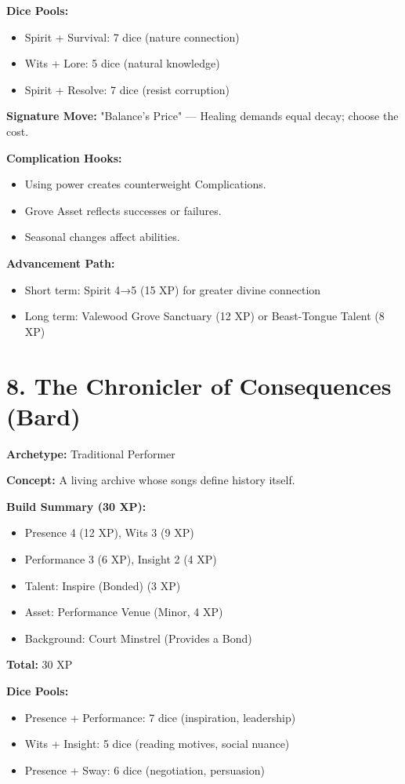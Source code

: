 \textbf{Dice Pools:}
\begin{itemize}
  \item Spirit + Survival: 7 dice (nature connection)
  \item Wits + Lore: 5 dice (natural knowledge)
  \item Spirit + Resolve: 7 dice (resist corruption)
\end{itemize}

\textbf{Signature Move:} "Balance's Price" — Healing demands equal decay; choose the cost.

\textbf{Complication Hooks:}
\begin{itemize}
  \item Using power creates counterweight Complications.
  \item Grove Asset reflects successes or failures.
  \item Seasonal changes affect abilities.
\end{itemize}

\textbf{Advancement Path:}
\begin{itemize}
  \item Short term: Spirit 4→5 (15 XP) for greater divine connection
  \item Long term: Valewood Grove Sanctuary (12 XP) or Beast-Tongue Talent (8 XP)
\end{itemize}

\section{8. The Chronicler of Consequences (Bard)}
\textbf{Archetype:} Traditional Performer

\textbf{Concept:} A living archive whose songs define history itself.

\textbf{Build Summary (30 XP):}
\begin{itemize}
  \item Presence 4 (12 XP), Wits 3 (9 XP)
  \item Performance 3 (6 XP), Insight 2 (4 XP)
  \item Talent: Inspire (Bonded) (3 XP)
  \item Asset: Performance Venue (Minor, 4 XP)
  \item Background: Court Minstrel (Provides a Bond)
\end{itemize}
\textbf{Total:} 30 XP

\textbf{Dice Pools:}
\begin{itemize}
  \item Presence + Performance: 7 dice (inspiration, leadership)
  \item Wits + Insight: 5 dice (reading motives, social nuance)
  \item Presence + Sway: 6 dice (negotiation, persuasion)
\end{itemize}

